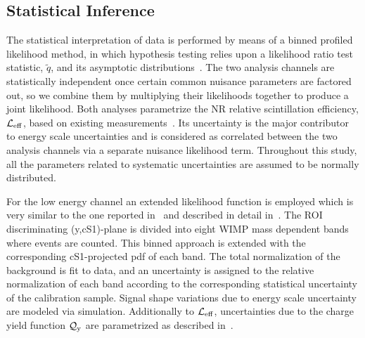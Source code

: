 
\subsection{Statistical Inference }
\label{sec:LikelihoodFunction}
The statistical interpretation of data is performed by means of a binned profiled likelihood method, in which hypothesis testing relies upon a likelihood ratio test statistic, $\tilde{q}$, 
and its asymptotic distributions~\cite{asympt}. The two analysis channels are statistically independent once certain common nuisance parameters are factored out, so we combine them by multiplying their likelihoods together to produce a joint likelihood.
Both analyses parametrize the NR relative scintillation efficiency, $\mathcal{L}_{\mathrm{eff}}$, based on existing measurements~\cite{run8Result}. Its uncertainty is the major contributor to energy scale uncertainties and is considered as correlated between the two analysis channels via a separate nuisance likelihood term.
Throughout this study, all the parameters related to systematic uncertainties are assumed to be normally distributed.

For the low energy channel an extended likelihood function is employed which is very similar to the one reported in~\cite{Aprile:2011hx} and described in detail in~\cite{xe100_run_combination}. 
The ROI discriminating (y,cS1)-plane is divided into eight WIMP mass dependent bands where events are counted. This binned approach is extended with the corresponding cS1-projected pdf of each band. The total normalization of the background is fit to data, and an uncertainty is assigned to the relative normalization of each band according to the corresponding statistical uncertainty of the calibration sample.
Signal shape variations due to energy scale uncertainty are modeled via simulation. Additionally to $\mathcal{L}_{\mathrm{eff}}$, uncertainties due to the charge yield function $\mathcal{Q}_{\mathrm{y}}$ are parametrized as described in~\cite{DataMCXenon}.

